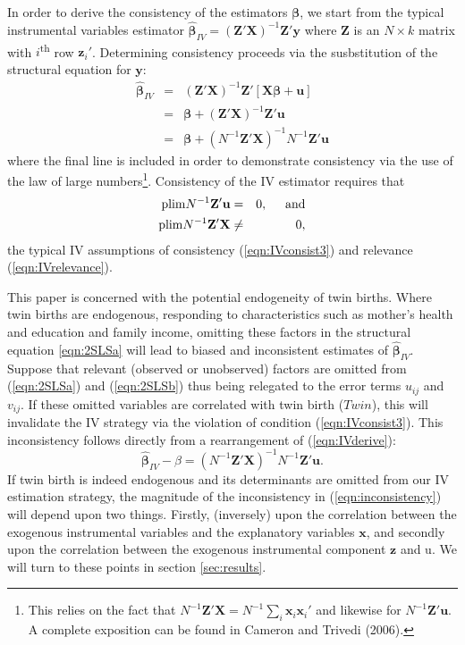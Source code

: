 \documentclass{article}[11pt,subeqn]
\newcommand{\vect}[1]{\mathbf{#1}}
\begin{document}
\begin{spacing}{1.25}
In order to derive the consistency of the estimators $\vect{\beta}$, we start from the typical instrumental variables estimator
$\vect{\hat{\beta}}_{IV}=(\vect{Z}'\vect{X})^{-1}\vect{Z}'\vect{y} $
where $\vect{Z}$ is an $N \times k$ matrix with $i$\textsuperscript{th} row $\vect{z}_i'$.  Determining consistency proceeds via
the susbstitution of the structural equation for $\vect{y}$:
\begin{eqnarray}
\label{eqn:IVderive}
\vect{\hat{\beta}}_{IV}&=&(\vect{Z}'\vect{X})^{-1}\vect{Z}'[\vect{X\beta}+\vect{u}] \nonumber\\
&=&\vect{\beta}+(\vect{Z}'\vect{X})^{-1}\vect{Z}'\vect{u}\nonumber\\
&=&\vect{\beta}+(N^{-1}\vect{Z}'\vect{X})^{-1}N^{-1}\vect{Z}'\vect{u}
\end{eqnarray}
where the final line is included in order to demonstrate consistency via the use of the law of large numbers\footnote{This relies
on the fact that $N^{-1}\vect{Z}'\vect{X}=N^{-1}\sum_i\vect{x}_i\vect{x}_i'$ and likewise for $N^{-1}\vect{Z}'\vect{u}$.  A
complete exposition can be found in Cameron and Trivedi (2006).}.  Consistency of the IV estimator requires that
\begin{eqnarray}
\mathrm{plim} N^{-1}\vect{Z'u}&=&0, \hspace{5mm}\mathrm{and} \label{eqn:IVconsist3}\\ 
\mathrm{plim} N^{-1}\vect{Z'X}&\neq&0, \label{eqn:IVrelevance}
\end{eqnarray}
the typical IV assumptions of consistency (\ref{eqn:IVconsist3}) and relevance (\ref{eqn:IVrelevance}).  

This paper is concerned 
with the potential endogeneity of twin births.  Where twin births are endogenous, responding to characteristics such as mother's 
health and education and family income, omitting these factors in the structural equation \ref{eqn:2SLSa} will lead to biased and 
inconsistent estimates of $\vect{\hat{\beta}}_{IV}$.  Suppose that relevant (observed or unobserved) factors are omitted from
(\ref{eqn:2SLSa}) and (\ref{eqn:2SLSb}) thus being relegated to the error terms $u_{ij}$ and $v_{ij}$.  If these omitted variables 
are correlated with twin birth ($Twin$), this will invalidate the IV strategy via the violation of condition (\ref{eqn:IVconsist3}).  This
inconsistency follows directly from a rearrangement of (\ref{eqn:IVderive}):
\begin{equation}
\label{eqn:inconsistency}
\vect{\hat{\beta}}_{IV}-\beta=(N^{-1}\vect{Z}'\vect{X})^{-1}N^{-1}\vect{Z}'\vect{u}.
\end{equation}
If twin birth is indeed endogenous and its determinants are omitted from our IV estimation strategy, the magnitude of the inconsistency in 
(\ref{eqn:inconsistency}) will depend upon two things.  Firstly, (inversely) upon the correlation between the exogenous instrumental
variables and the explanatory variables $\vect{x}$, and secondly upon the correlation between the exogenous instrumental component
$\vect{z}$ and u.  We will turn to these points in section \ref{sec:results}.


\end{spacing}
\end{document}
